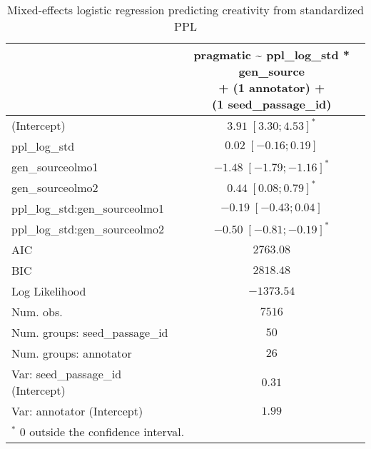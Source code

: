 
\usepackage{booktabs}

\begin{table}[htbp]
\begin{center}
\begin{tabular}{l c}
\toprule
 & \shortstack[l]{pragmatic \textasciitilde{} ppl\_log\_std * gen\_source  \\ 
+ (1 \textbar{} annotator) + \\ 
(1 \textbar{} seed\_passage\_id)} \\
\midrule
(Intercept)                        & $3.91 \; [ 3.30;  4.53]^{*}$  \\
ppl\_log\_std                      & $0.02 \; [-0.16;  0.19]$      \\
gen\_sourceolmo1                   & $-1.48 \; [-1.79; -1.16]^{*}$ \\
gen\_sourceolmo2                   & $0.44 \; [ 0.08;  0.79]^{*}$  \\
ppl\_log\_std:gen\_sourceolmo1     & $-0.19 \; [-0.43;  0.04]$     \\
ppl\_log\_std:gen\_sourceolmo2     & $-0.50 \; [-0.81; -0.19]^{*}$ \\
\midrule
AIC                                & $2763.08$                     \\
BIC                                & $2818.48$                     \\
Log Likelihood                     & $-1373.54$                    \\
Num. obs.                          & $7516$                        \\
Num. groups: seed\_passage\_id     & $50$                          \\
Num. groups: annotator             & $26$                          \\
Var: seed\_passage\_id (Intercept) & $0.31$                        \\
Var: annotator (Intercept)         & $1.99$                        \\
\bottomrule
\multicolumn{2}{l}{\scriptsize{$^*$ 0 outside the confidence interval.}}
\end{tabular}
\caption{Mixed-effects logistic regression predicting creativity from standardized PPL}
\label{tab:glmer_ppl_prag_src}
\end{center}
\end{table}
